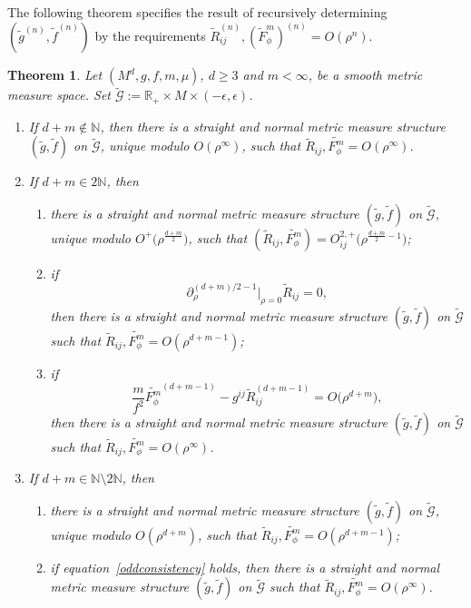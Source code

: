 \documentclass[11pt]{article}
\numberwithin{equation}{section}
\numberwithin{equation}{section}
\newtheorem{Theorem}{Theorem}[section]
\begin{document}
The following theorem specifies the result of recursively determining $(\widetilde{g}^{(n)},\widetilde{f}^{(n)})$ by the requirements $\widetilde{R}_{ij}^{(n)},(\widetilde{F}_\phi^m)^{(n)}=O(\rho^n)$.
\begin{Theorem}
\label{various-possibilities}
Let $(M^d,g,f,m,\mu)$, $d\geq 3$ and $m<\infty$, be a smooth metric measure space. Set $\widetilde{\mathcal{G}}:=\mathbb{R}_+\times M\times (-\epsilon,\epsilon)$.
\begin{enumerate}[label=$(\roman*)$]\itemsep=0pt
\item If $d+m\notin\mathbb{N}$, then there is a straight and normal metric measure structure $(\widetilde{g},\widetilde{f})$ on $\widetilde{\mathcal{G}}$, unique modulo $O(\rho^\infty)$, such that $\widetilde{R}_{ij},\widetilde{F_\phi^m}=O(\rho^\infty)$.

\item If $d+m\in 2\mathbb{N}$, then
\begin{enumerate}\itemsep=0pt
\item[$(a)$] there is a straight and normal metric measure structure $(\widetilde{g},\widetilde{f})$ on $\widetilde{\mathcal{G}}$, unique modulo $O^+\big(\rho^{\frac{d+m}{2}}\big)$, such that $(\widetilde{R}_{ij},\widetilde{F_\phi^m})=O_{ij}^{2,+}\big(\rho^{\frac{d+m}{2}-1}\big)$;
\item[$(b)$] if
\[
\partial_\rho^{(d+m)/2-1}\big|_{\rho=0}\widetilde{R}_{ij}=0,
\]
then there is a straight and normal metric measure structure $(\widetilde{g},\widetilde{f})$ on $\widetilde{\mathcal{G}}$ such that $\widetilde{R}_{ij},\widetilde{F_\phi^m}=O(\rho^{d+m-1})$;

\item[$(c)$] if
\begin{equation}\label{oddconsistency}
\frac{m}{f^2} \widetilde{F_\phi^m}^{(d+m-1)}-g^{ij}\widetilde{R}_{ij}^{(d+m-1)}=O\big(\rho^{d+m}\big),
\end{equation}
then there is a straight and normal metric measure structure $(\widetilde{g},\widetilde{f})$ on $\widetilde{\mathcal{G}}$ such that $\widetilde{R}_{ij},\widetilde{F_\phi^m}=O(\rho^\infty)$.
\end{enumerate}

\item If $d+m\in \mathbb{N}\setminus 2\mathbb{N}$, then
\begin{enumerate}\itemsep=0pt
\item[$(a)$] there is a straight and normal metric measure structure $(\widetilde{g},\widetilde{f})$ on $\widetilde{\mathcal{G}}$, unique modulo $O(\rho^{d+m})$, such that $\widetilde{R}_{ij},\widetilde{F_\phi^m}=O(\rho^{d+m-1})$;
\item[$(b)$] if equation~\eqref{oddconsistency} holds, then there is a straight and normal metric measure structure $(\widetilde{g},\widetilde{f})$ on $\widetilde{\mathcal{G}}$ such that $\widetilde{R}_{ij},\widetilde{F_\phi^m}=O(\rho^\infty)$.
\end{enumerate}
\end{enumerate}
\end{Theorem}
\end{document}
